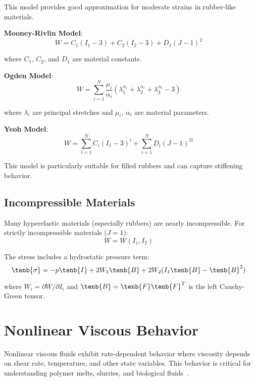 This model provides good approximation for moderate strains in rubber-like materials.

\textbf{Mooney-Rivlin Model}:
\begin{equation}
W = C_1(I_1 - 3) + C_2(I_2 - 3) + D_1(J - 1)^2
\end{equation}

where $C_1$, $C_2$, and $D_1$ are material constants.

\textbf{Ogden Model}:
\begin{equation}
W = \sum_{i=1}^N \frac{\mu_i}{\alpha_i}(\lambda_1^{\alpha_i} + \lambda_2^{\alpha_i} + \lambda_3^{\alpha_i} - 3)
\end{equation}

where $\lambda_i$ are principal stretches and $\mu_i$, $\alpha_i$ are material parameters.

\textbf{Yeoh Model}:
\begin{equation}
W = \sum_{i=1}^N C_i(I_1 - 3)^i + \sum_{i=1}^N D_i(J - 1)^{2i}
\end{equation}

This model is particularly suitable for filled rubbers and can capture stiffening behavior.

\subsection{Incompressible Materials}

Many hyperelastic materials (especially rubbers) are nearly incompressible. For strictly incompressible materials ($J = 1$):
\begin{equation}
W = W(I_1, I_2)
\end{equation}

The stress includes a hydrostatic pressure term:
\begin{equation}
\tenb{\sigma} = -p\tenb{I} + 2W_1\tenb{B} + 2W_2(I_1\tenb{B} - \tenb{B}^2)
\end{equation}

where $W_i = \partial W/\partial I_i$ and $\tenb{B} = \tenb{F}\tenb{F}^T$ is the left Cauchy-Green tensor.

\section{Nonlinear Viscous Behavior}

Nonlinear viscous fluids exhibit rate-dependent behavior where viscosity depends on shear rate, temperature, and other state variables. This behavior is critical for understanding polymer melts, slurries, and biological fluids~\autocite{Sadd.2019}.

